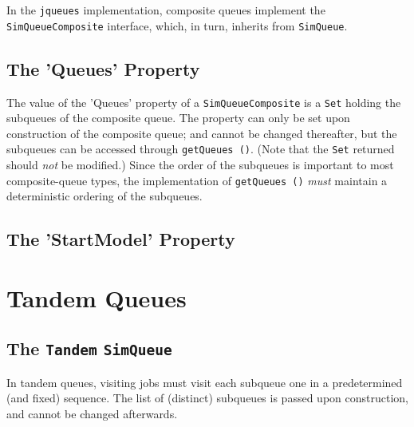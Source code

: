 \documentclass[12pt]{book}
\begin{document}
In the \lstinline|jqueues| implementation,
  composite queues implement the \lstinline|SimQueueComposite| interface,
  which, in turn, inherits from \lstinline|SimQueue|.

\subsection{The 'Queues' Property}

The value of the 'Queues' property of a \lstinline|SimQueueComposite|
  is a \lstinline|Set| holding the subqueues of the composite queue.
The property can only be set upon construction of the composite queue;
  and cannot be changed thereafter,
  but the subqueues can be accessed through \lstinline|getQueues ()|.
(Note that the \lstinline|Set| returned should {\em not\/} be modified.)
Since the order of the subqueues is important to most composite-queue types,
  the implementation of \lstinline|getQueues ()| {\em must\/} maintain
  a deterministic ordering of the subqueues.
  
\subsection{The 'StartModel' Property}

\section{Tandem Queues}

\subsection{The \lstinline{Tandem} \lstinline{SimQueue}}

In tandem queues, visiting jobs must visit each subqueue one in a predetermined (and fixed) sequence.
The list of (distinct) subqueues is passed upon construction, and cannot be changed afterwards.
\end{document}
